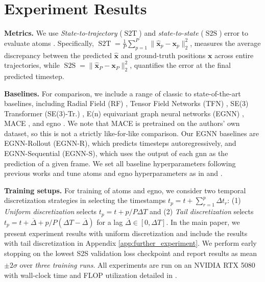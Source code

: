 \section{Experiment Results}
\vspace{-0.5em}
\textbf{Metrics.}
We use \textit{State-to-trajectory}  ($\operatorname{S2T}$) and \textit{state-to-state} ($\operatorname{S2S}$) error to evaluate \gls{atoms}  \cite{xu_equivariant_2024}. Specifically,  $\operatorname{S2T} = \frac{1}{P}\sum_{p=1}^P\|\hat{\mathbf{x}}_p - \mathbf{x}_p\|_2^2$, measures the average discrepancy between the predicted \(\hat{\mathbf{x}}\) and ground-truth positions \(\mathbf{x}\) across entire trajectories, while  $\operatorname{S2S} = \|\hat{\mathbf{x}}_P - \mathbf{x}_P\|_2^2$, quantifies the error at the final predicted timestep.



\textbf{Baselines.} For comparison, we include a range of classic to state-of-the-art baselines, including Radial Field (RF) \cite{kohler_equivariant_2019}, Tensor Field Networks (TFN) \citep{thomas_tensor_2018}, SE(3) Transformer (SE(3)-Tr.) \citep{fuchs_se3-transformers_2020}, E(n) equivariant graph neural networks (EGNN) \citep{garcia_satorras_en_2021}, MACE \cite{batatia_mace_2023}, and \gls{egno} \citep{xu_equivariant_2024}. We note that MACE is pretrained on the authors’ own dataset, so this is not a strictly like-for-like comparison. Our EGNN baselines are {EGNN-R}ollout (EGNN-R), which predicts timesteps autoregressively, and {EGNN-S}equential (EGNN-S), which uses the output of each \gls{gnn} as the prediction of a given frame. 
We set all baseline hyperparameters following previous works \cite{xu_equivariant_2024, xu_geodiff_2022, shi_learning_2021} and tune \gls{atoms} and \gls{egno} hyperparameters as in  and . 


\textbf{Training setups.}
For training of \gls{atoms} and \gls{egno}, we consider two temporal discretization strategies in selecting the timestamps $t_p =t+\sum_{r=1}^{p}\Delta t_r$: (1) \textit{Uniform discretization} selects $t_p = t + p/P \Delta T$ and (2) \textit{Tail discretization} selects $t_p = t + \overline{\Delta} + p/P (\Delta T - \overline{\Delta})$ for a lag $\overline{\Delta} \in [0, \Delta T]$. In the main paper, we present experiment results with {uniform discretization} and include the results with tail discretization in Appendix \ref{app:further_experiment}.  We perform early stopping on the lowest S2S validation loss checkpoint and report results as mean \(\pm 2 \sigma\) over \textit{three training runs}. All experiments are run on an NVIDIA\textsuperscript{\textregistered} RTX 5080 with wall-clock time and FLOP utilization detailed in .


